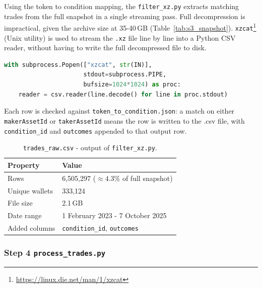 \documentclass[11pt]{article}
\begin{document}
Using the token to condition mapping, the \texttt{filter\_xz.py} extracts matching trades from the full snapshot in a single streaming pass.
Full decompression is impractical, given the archive size
at 35-40\,GB (Table~\ref{tab:s3_snapshot}). 
\texttt{xzcat}\footnote{\url{https://linux.die.net/man/1/xzcat}} (Unix utility) is used to stream the \texttt{.xz} file line by line into a Python CSV reader, without having to write the full decompressed file to disk. 

\begin{lstlisting}[language=Python, caption={Streaming the \texttt{.xz} archive without full decompression.}, label={lst:filter_xz}]
with subprocess.Popen(["xzcat", str(IN)], 
                      stdout=subprocess.PIPE, 
                      bufsize=1024*1024) as proc:
    reader = csv.reader(line.decode() for line in proc.stdout)
\end{lstlisting}

\noindent Each row is checked against \texttt{token\_to\_condition.json}:
a match on either \texttt{makerAssetId} or \texttt{takerAssetId} means the row is written to the .csv file, with \texttt{condition\_id} and \texttt{outcomes} appended to that output row.

\begin{table}[H]
\centering
\caption{\texttt{trades\_raw.csv} - output of \texttt{filter\_xz.py}.}
\label{tab:trades_raw}
\small
\begin{tabularx}{\textwidth}{l X}
\toprule
\textbf{Property} & \textbf{Value} \\
\midrule
Rows           & 6,505,297 ($\approx4.3\%$ of full snapshot) \\
Unique wallets & 333,124 \\
File size      & 2.1\,GB \\
Date range     & 1 February 2023 - 7 October 2025 \\
Added columns  & \texttt{condition\_id}, \texttt{outcomes} \\
\bottomrule
\end{tabularx}
\end{table}










\subsubsection*{Step 4 \texttt{process\_trades.py}}
\end{document}
